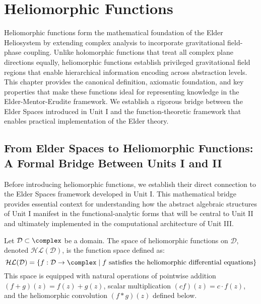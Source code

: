 \chapter{Heliomorphic Functions}

\begin{tcolorbox}[colback=DarkSkyBlue!5!white,colframe=DarkSkyBlue!75!black,title=Chapter Summary]
Heliomorphic functions form the mathematical foundation of the Elder Heliosystem by extending complex analysis to incorporate gravitational field-phase coupling. Unlike holomorphic functions that treat all complex plane directions equally, heliomorphic functions establish privileged gravitational field regions that enable hierarchical information encoding across abstraction levels. This chapter provides the canonical definition, axiomatic foundation, and key properties that make these functions ideal for representing knowledge in the Elder-Mentor-Erudite framework. We establish a rigorous bridge between the Elder Spaces introduced in Unit I and the function-theoretic framework that enables practical implementation of the Elder theory.
\end{tcolorbox}

\section{From Elder Spaces to Heliomorphic Functions: A Formal Bridge Between Units I and II}

Before introducing heliomorphic functions, we establish their direct connection to the Elder Spaces framework developed in Unit I. This mathematical bridge provides essential context for understanding how the abstract algebraic structures of Unit I manifest in the functional-analytic forms that will be central to Unit II and ultimately implemented in the computational architecture of Unit III.

\begin{definition}
Let $\mathcal{D} \subset \complex$ be a domain. The space of heliomorphic functions on $\mathcal{D}$, denoted $\mathcal{HL}(\mathcal{D})$, is the function space defined as:
\begin{equation}
\mathcal{HL}(\mathcal{D}) = \left\{ f: \mathcal{D} \rightarrow \complex \; \middle| \; f \text{ satisfies the heliomorphic differential equations} \right\}
\end{equation}
This space is equipped with natural operations of pointwise addition $(f+g)(z) = f(z) + g(z)$, scalar multiplication $(cf)(z) = c \cdot f(z)$, and the heliomorphic convolution $(f * g)(z)$ defined below.
\end{definition}

